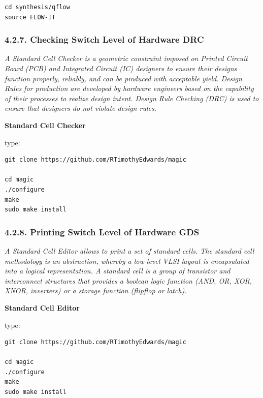 \documentclass[
]{article}
\begin{document}
\begin{verbatim}
cd synthesis/qflow
source FLOW-IT
\end{verbatim}

\hypertarget{checking-switch-level-of-hardware-drc}{%
\subsubsection{4.2.7. Checking Switch Level of Hardware
DRC}\label{checking-switch-level-of-hardware-drc}}

\emph{A Standard Cell Checker is a geometric constraint imposed on
Printed Circuit Board (PCB) and Integrated Circuit (IC) designers to
ensure their designs function properly, reliably, and can be produced
with acceptable yield. Design Rules for production are developed by
hardware engineers based on the capability of their processes to realize
design intent. Design Rule Checking (DRC) is used to ensure that
designers do not violate design rules.}

\textbf{Standard Cell Checker}

type:

\begin{verbatim}
git clone https://github.com/RTimothyEdwards/magic

cd magic
./configure
make
sudo make install
\end{verbatim}

\hypertarget{printing-switch-level-of-hardware-gds}{%
\subsubsection{4.2.8. Printing Switch Level of Hardware
GDS}\label{printing-switch-level-of-hardware-gds}}

\emph{A Standard Cell Editor allows to print a set of standard cells.
The standard cell methodology is an abstraction, whereby a low-level
VLSI layout is encapsulated into a logical representation. A standard
cell is a group of transistor and interconnect structures that provides
a boolean logic function (AND, OR, XOR, XNOR, inverters) or a storage
function (flipflop or latch).}

\textbf{Standard Cell Editor}

type:

\begin{verbatim}
git clone https://github.com/RTimothyEdwards/magic

cd magic
./configure
make
sudo make install
\end{verbatim}
\end{document}
